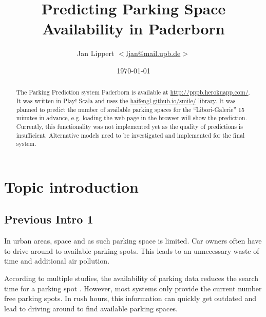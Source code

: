 \documentclass[journal,10pt]{IEEEtran}
\author{Jan Lippert \(<\)\href{mailto:ljan@mail.upb.de}{ljan@mail.upb.de}\(>\)}
\date{\today}
\begin{document}
\title{Predicting Parking Space Availability in Paderborn}
\maketitle

\begin{abstract}
The Parking Prediction system Paderborn is available at \url{http://pppb.herokuapp.com/}. It was written in Play! Scala and uses the \href{smile}{haifengl.github.io/smile/} library. It was planned to predict the number of available parking spaces for the ``Libori-Galerie'' 15 minutes in advance, e.g. loading the web page in the browser will show the prediction. Currently, this functionality was not implemented yet as the quality of predictions is insufficient. Alternative models need to be investigated and implemented for the final system. 
\end{abstract}

\section{Topic introduction}

\subsection{Previous Intro 1}

In urban areas, space and as such parking space is limited. Car owners often have to drive around to available parking spots. This leads to an unnecessary waste of time and additional air pollution. 

According to multiple studies, the availability of parking data reduces the search time for a parking spot \cite{Asakura1994}\cite{Caicedo2010228}. However, most systems only provide the current number free parking spots. In rush hours, this information can quickly get outdated and lead to driving around to find available parking spaces.

\end{document}
